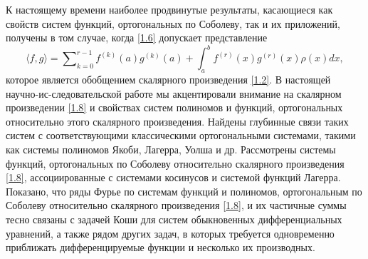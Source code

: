 К настоящему времени наиболее продвинутые результаты, касающиеся как \linebreak свойств систем  функций, ортогональных по Соболеву, так и их приложений,  получены в том случае, когда \eqref{1.6} допускает представление
\begin{equation}\label{1.8}
\langle f,g\rangle=\sum\nolimits_{k=0}^{r-1}f^{(k)}(a)g^{(k)}(a)+\int_{a}^{b}f^{(r)}(x)g^{(r)}(x)\rho(x)dx,
\end{equation}
которое является обобщением скалярного произведения \eqref{1.2}. В настоящей научно-ис-\linebreak следовательской работе мы акцентировали внимание на скалярном произведении \eqref{1.8} и свойствах систем полиномов и функций, ортогональных относительно этого скалярного произведения. Найдены глубинные связи таких систем с соответствующими классическими ортогональными системами, такими как системы полиномов Якоби, Лагерра, Уолша и др. Рассмотрены системы функций, ортогональных по Соболеву относительно скалярного произведения \eqref{1.8}, ассоциированные с системами косинусов и системой функций Лагерра.  Показано, что  ряды Фурье по системам функций и полиномов, ортогональным по Соболеву относительно скалярного произведения \eqref{1.8}, и их частичные суммы тесно связаны с задачей Коши для систем обыкновенных дифференциальных уравнений, а также рядом других задач, в которых требуется одновременно приближать дифференцируемые функции и несколько их производных.


